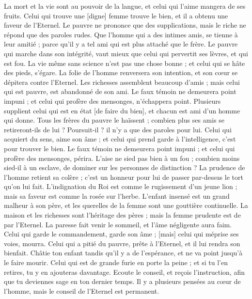 \begin{multicols}{2}
La mort et la vie sont au pouvoir de la langue, et celui qui l'aime mangera de ses fruits.
Celui qui trouve une [digne] femme trouve le bien, et il a obtenu une faveur de l'Eternel.
Le pauvre ne prononce que des supplications, mais le riche ne répond que des paroles rudes.
Que l'homme qui a des intimes amis, se tienne à leur amitié ; parce qu'il y a tel ami qui est plus attaché que le frère.
\VerseOne{}Le pauvre qui marche dans son intégrité, vaut mieux que celui qui pervertit ses lèvres, et qui est fou.
La vie même sans science n'est pas une chose bonne ; et celui qui se hâte des pieds, s'égare.
La folie de l'homme renversera son intention, et son cœur se dépitera contre l'Eternel.
Les richesses assemblent beaucoup d'amis ; mais celui qui est pauvre, est abandonné de son ami.
Le faux témoin ne demeurera point impuni ; et celui qui profère des mensonges, n'échappera point.
Plusieurs supplient celui qui est en état [de faire du bien], et chacun est ami d'un homme qui donne.
Tous les frères du pauvre le haïssent ; combien plus ses amis se retireront-ils de lui ? Poursuit-il ? il n'y a que des paroles pour lui.
Celui qui acquiert du sens, aime son âme ; et celui qui prend garde à l'intelligence, c'est pour trouver le bien.
Le faux témoin ne demeurera point impuni ; et celui qui profère des mensonges, périra.
L'aise ne sied pas bien à un fou ; combien moins sied-il à un esclave, de dominer sur les personnes de distinction ?
La prudence de l'homme retient sa colère ; c'est un honneur pour lui de passer par-dessus le tort qu'on lui fait.
L'indignation du Roi est comme le rugissement d'un jeune lion ; mais sa faveur est comme la rosée sur l'herbe.
L'enfant insensé est un grand malheur à son père, et les querelles de la femme sont une gouttière continuelle.
La maison et les richesses sont l'héritage des pères ; mais la femme prudente est de par l'Eternel.
La paresse fait venir le sommeil, et l'âme négligente aura faim.
Celui qui garde le commandement, garde son âme ; [mais] celui qui méprise ses voies, mourra.
Celui qui a pitié du pauvre, prête à l'Eternel, et il lui rendra son bienfait.
Châtie ton enfant tandis qu'il y a de l'espérance, et ne va point jusqu'à le faire mourir.
Celui qui est de grande furie en porte la peine ; et si tu l'en retires, tu y en ajouteras davantage.
Ecoute le conseil, et reçois l'instruction, afin que tu deviennes sage en ton dernier temps.
Il y a plusieurs pensées au cœur de l'homme, mais le conseil de l'Eternel est permanent.

\end{multicols}
